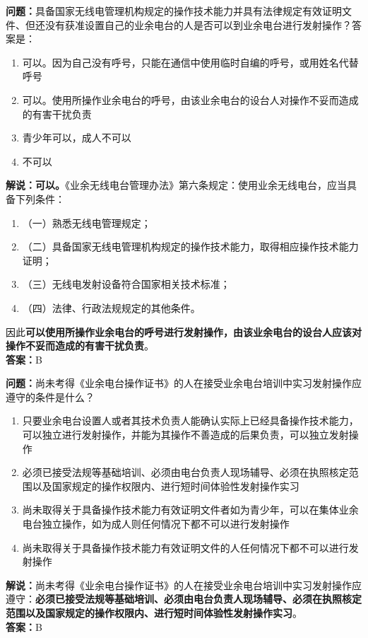 \documentclass{ctexbook}
\begin{document}


\bigskip


\noindent\textbf{问题：}具备国家无线电管理机构规定的操作技术能力并具有法律规定有效证明文件、但还没有获准设置自己的业余电台的人是否可以到业余电台进行发射操作？答案是：
\begin{enumerate}[label=\Alph*), leftmargin=3em]
	\item 可以。因为自己没有呼号，只能在通信中使用临时自编的呼号，或用姓名代替呼号
	\item 可以。使用所操作业余电台的呼号，由该业余电台的设台人对操作不妥而造成的有害干扰负责
	\item 青少年可以，成人不可以
	\item 不可以
\end{enumerate}
\noindent\textbf{解说：可以。}《业余无线电台管理办法》第六条规定：使用业余无线电台，应当具备下列条件：
\begin{enumerate}[label=, leftmargin=1em]
	\item （一）熟悉无线电管理规定；
	\item （二）具备国家无线电管理机构规定的操作技术能力，取得相应操作技术能力证明；
	\item （三）无线电发射设备符合国家相关技术标准；
	\item （四）法律、行政法规规定的其他条件。
\end{enumerate}
因此\textbf{可以使用所操作业余电台的呼号进行发射操作，由该业余电台的设台人应该对操作不妥而造成的有害干扰负责}。\\\noindent\textbf{答案：}B


\bigskip


\noindent\textbf{问题：}尚未考得《业余电台操作证书》的人在接受业余电台培训中实习发射操作应遵守的条件是什么？
\begin{enumerate}[label=\Alph*), leftmargin=3em]
	\item 只要业余电台设置人或者其技术负责人能确认实际上已经具备操作技术能力，可以独立进行发射操作，并能为其操作不善造成的后果负责，可以独立发射操作
	\item 必须已接受法规等基础培训、必须由电台负责人现场辅导、必须在执照核定范围以及国家规定的操作权限内、进行短时间体验性发射操作实习
	\item 尚未取得关于具备操作技术能力有效证明文件者如为青少年，可以在集体业余电台独立操作，如为成人则任何情况下都不可以进行发射操作
	\item 尚未取得关于具备操作技术能力有效证明文件的人任何情况下都不可以进行发射操作
\end{enumerate}
\noindent\textbf{解说：}尚未考得《业余电台操作证书》的人在接受业余电台培训中实习发射操作应遵守：\textbf{必须已接受法规等基础培训、必须由电台负责人现场辅导、必须在执照核定范围以及国家规定的操作权限内、进行短时间体验性发射操作实习}。\\\noindent\textbf{答案：}B
\end{document}
